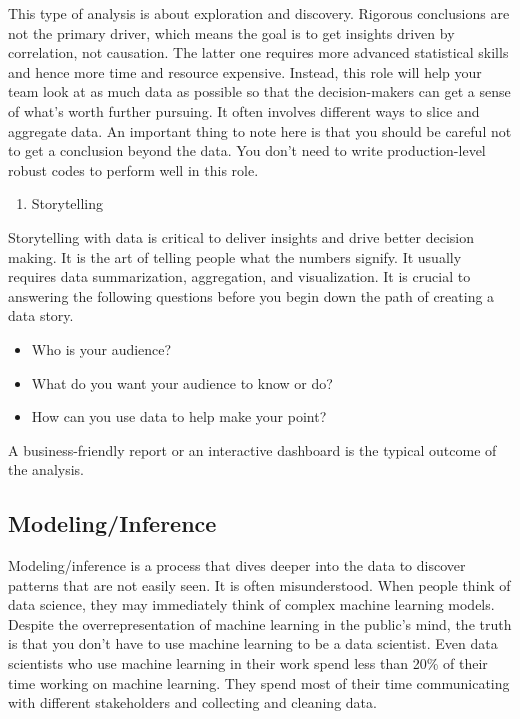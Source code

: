 \documentclass[
  12pt,
]{krantz}
\providecommand{\tightlist}{%
  \setlength{\itemsep}{0pt}\setlength{\parskip}{0pt}}
\begin{document}
This type of analysis is about exploration and discovery. Rigorous conclusions are not the primary driver, which means the goal is to get insights driven by correlation, not causation. The latter one requires more advanced statistical skills and hence more time and resource expensive. Instead, this role will help your team look at as much data as possible so that the decision-makers can get a sense of what's worth further pursuing. It often involves different ways to slice and aggregate data. An important thing to note here is that you should be careful not to get a conclusion beyond the data. You don't need to write production-level robust codes to perform well in this role.

\begin{enumerate}
\def\labelenumi{(\arabic{enumi})}
\setcounter{enumi}{2}
\tightlist
\item
  Storytelling
\end{enumerate}

Storytelling with data is critical to deliver insights and drive better decision making. It is the art of telling people what the numbers signify. It usually requires data summarization, aggregation, and visualization. It is crucial to answering the following questions before you begin down the path of creating a data story.

\begin{itemize}
\tightlist
\item
  Who is your audience?
\item
  What do you want your audience to know or do?
\item
  How can you use data to help make your point?
\end{itemize}

A business-friendly report or an interactive dashboard is the typical outcome of the analysis.

\hypertarget{modelinginference}{%
\subsection{Modeling/Inference}\label{modelinginference}}

Modeling/inference is a process that dives deeper into the data to discover patterns that are not easily seen. It is often misunderstood. When people think of data science, they may immediately think of complex machine learning models. Despite the overrepresentation of machine learning in the public's mind, the truth is that you don't have to use machine learning to be a data scientist. Even data scientists who use machine learning in their work spend less than 20\% of their time working on machine learning. They spend most of their time communicating with different stakeholders and collecting and cleaning data.
\end{document}
